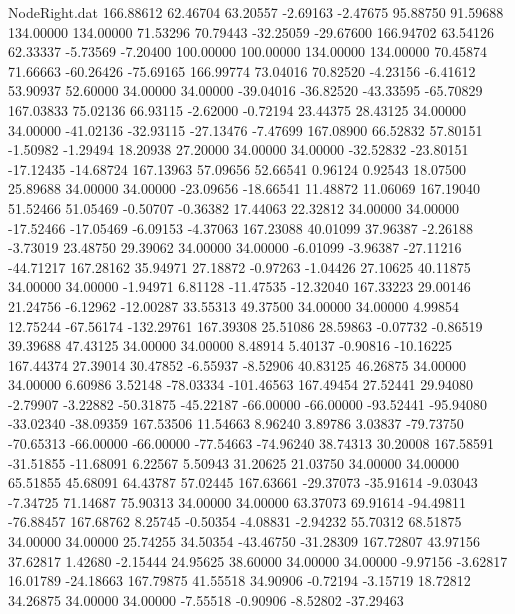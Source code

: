 \begin{filecontents}{NodeRight.dat}
 166.88612   62.46704   63.20557    -2.69163   -2.47675   95.88750   91.59688  134.00000  134.00000   71.53296   70.79443  -32.25059  -29.67600
 166.94702   63.54126   62.33337    -5.73569   -7.20400  100.00000  100.00000  134.00000  134.00000   70.45874   71.66663  -60.26426  -75.69165
 166.99774   73.04016   70.82520    -4.23156   -6.41612   53.90937   52.60000   34.00000   34.00000  -39.04016  -36.82520  -43.33595  -65.70829
 167.03833   75.02136   66.93115    -2.62000   -0.72194   23.44375   28.43125   34.00000   34.00000  -41.02136  -32.93115  -27.13476   -7.47699
 167.08900   66.52832   57.80151    -1.50982   -1.29494   18.20938   27.20000   34.00000   34.00000  -32.52832  -23.80151  -17.12435  -14.68724
 167.13963   57.09656   52.66541     0.96124    0.92543   18.07500   25.89688   34.00000   34.00000  -23.09656  -18.66541   11.48872   11.06069
 167.19040   51.52466   51.05469    -0.50707   -0.36382   17.44063   22.32812   34.00000   34.00000  -17.52466  -17.05469   -6.09153   -4.37063
 167.23088   40.01099   37.96387    -2.26188   -3.73019   23.48750   29.39062   34.00000   34.00000   -6.01099   -3.96387  -27.11216  -44.71217
 167.28162   35.94971   27.18872    -0.97263   -1.04426   27.10625   40.11875   34.00000   34.00000   -1.94971    6.81128  -11.47535  -12.32040
 167.33223   29.00146   21.24756    -6.12962  -12.00287   33.55313   49.37500   34.00000   34.00000    4.99854   12.75244  -67.56174 -132.29761
 167.39308   25.51086   28.59863    -0.07732   -0.86519   39.39688   47.43125   34.00000   34.00000    8.48914    5.40137   -0.90816  -10.16225
 167.44374   27.39014   30.47852    -6.55937   -8.52906   40.83125   46.26875   34.00000   34.00000    6.60986    3.52148  -78.03334 -101.46563
 167.49454   27.52441   29.94080    -2.79907   -3.22882  -50.31875  -45.22187  -66.00000  -66.00000  -93.52441  -95.94080  -33.02340  -38.09359
 167.53506   11.54663    8.96240     3.89786    3.03837  -79.73750  -70.65313  -66.00000  -66.00000  -77.54663  -74.96240   38.74313   30.20008
 167.58591  -31.51855  -11.68091     6.22567    5.50943   31.20625   21.03750   34.00000   34.00000   65.51855   45.68091   64.43787   57.02445
 167.63661  -29.37073  -35.91614    -9.03043   -7.34725   71.14687   75.90313   34.00000   34.00000   63.37073   69.91614  -94.49811  -76.88457
 167.68762    8.25745   -0.50354    -4.08831   -2.94232   55.70312   68.51875   34.00000   34.00000   25.74255   34.50354  -43.46750  -31.28309
 167.72807   43.97156   37.62817     1.42680   -2.15444   24.95625   38.60000   34.00000   34.00000   -9.97156   -3.62817   16.01789  -24.18663
 167.79875   41.55518   34.90906    -0.72194   -3.15719   18.72812   34.26875   34.00000   34.00000   -7.55518   -0.90906   -8.52802  -37.29463

\end{filecontents}
